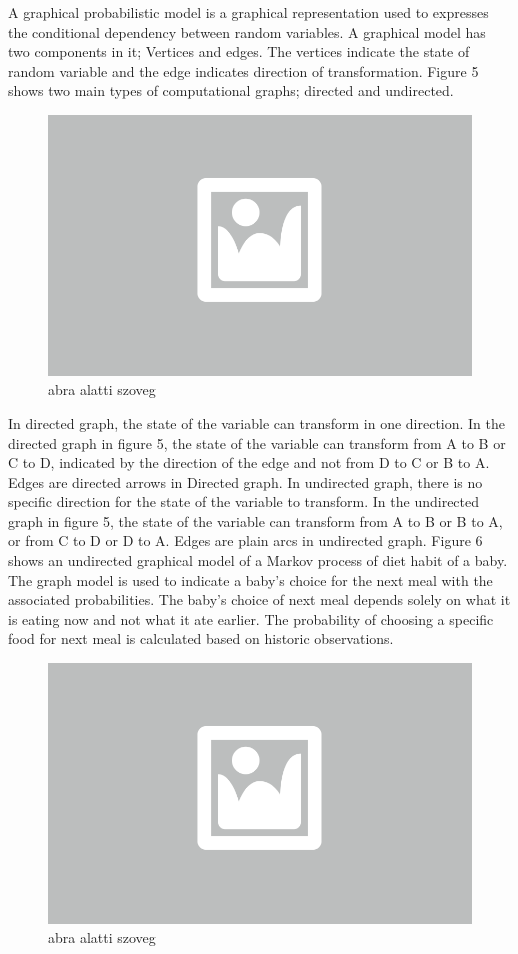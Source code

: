 A graphical probabilistic model is a graphical representation used to expresses the conditional dependency between random variables. A graphical model has two components in it; Vertices and edges. The vertices indicate the state of random variable and the edge indicates direction of transformation. Figure 5 shows two main types of computational graphs; directed and undirected.

\begin{figure}[ht]
	\centering
	\includegraphics[width=0.65\columnwidth]{figures/abra.png}
	\caption{abra alatti szoveg}
\end{figure}

In directed graph, the state of the variable can transform in one direction. In the directed graph in figure 5, the state of the variable can transform from A to B or C to D, indicated by the direction of the edge and not from D to C or B to A. Edges are directed arrows in Directed graph. In undirected graph, there is no specific direction for the state of the variable to transform. In the undirected graph in figure 5, the state of the variable can transform from A to B or B to A, or from C to D or D to A. Edges are plain arcs in undirected graph. Figure 6 shows an undirected graphical model of a Markov process of diet habit of a baby. The graph model is used to indicate a baby’s choice for the next meal with the associated probabilities. The baby’s choice of next meal depends solely on what it is eating now and not what it ate earlier. The probability of choosing a specific food for next meal is calculated based on historic observations.

\begin{figure}[ht]
	\centering
	\includegraphics[width=0.65\columnwidth]{figures/abra.png}
	\caption{abra alatti szoveg}
\end{figure}

